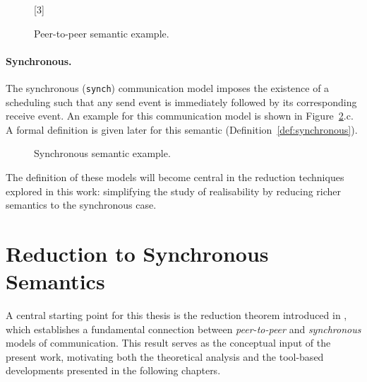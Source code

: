 \begin{figure}[!ht]
    \centering
      \begin{msc}[draw frame=none, draw head=none, msc keyword=, 
                    head height=0px, label distance=0.5ex, 
                    foot height=0px, foot distance=0px]{}

            [3]
            \nextlevel
            \nextlevel
        \end{msc}
  \caption{Peer-to-peer semantic example.}
  \label{fig:p2p}
\end{figure}

\paragraph{Synchronous.}
The synchronous (\verb|synch|) communication model imposes 
the existence of a scheduling such that any send event is 
immediately followed by its corresponding receive event. 
An example for this communication model is shown in 
Figure~\ref{fig:sync}.c. A formal definition is given later 
for this semantic (Definition~\ref{def:synchronous}).

\begin{figure}[!ht]
    \centering
      \begin{msc}[draw frame=none, draw head=none, msc keyword=, 
                  head height=0px, label distance=0.5ex, 
                  foot height=0px, foot distance=0px]{}

          \nextlevel
      \end{msc}
  \caption{Synchronous semantic example.}
  \label{fig:sync}
\end{figure}

The definition of these models will become central in
the reduction techniques explored in this work: 
simplifying the study of realisability
by reducing richer semantics to the synchronous case.

\section{Reduction to Synchronous Semantics}
\label{sec:red}

A central starting point for this thesis is the reduction theorem introduced in 
\cite[Theorem~5.3]{di2025realisability}, which establishes a fundamental connection 
between \emph{peer-to-peer} and \emph{synchronous} models of communication.  
This result serves as the conceptual input of the present work, motivating both the 
theoretical analysis and the tool-based developments presented in the following chapters.

